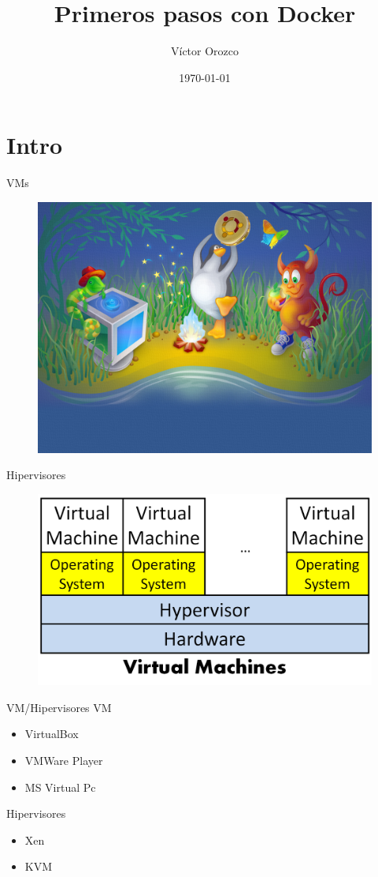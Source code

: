 \documentclass{beamer}
\title{Primeros pasos con Docker}
\author{Víctor Orozco}
\institute{Nabenik}
\date{\today}
\begin{document}
\frame{\titlepage}

\section{Intro}

\begin{frame}{VMs}
\begin{figure}
\centering
\includegraphics[width=0.7\linewidth]{Images/virtualbox}
\label{fig:vm}
\end{figure}
\end{frame}

\begin{frame}{Hipervisores}
\begin{figure}
\centering
\includegraphics[width=0.7\linewidth]{Images/hypervisors}
\label{fig:hypervisors}
\end{figure}
\end{frame}

\begin{frame}{VM/Hipervisores}
VM
\begin{itemize}
\item VirtualBox
\item VMWare Player
\item MS Virtual Pc
\end{itemize}
Hipervisores
\begin{itemize}
\item Xen
\item KVM
\end{itemize}
\end{frame}
\end{document}
